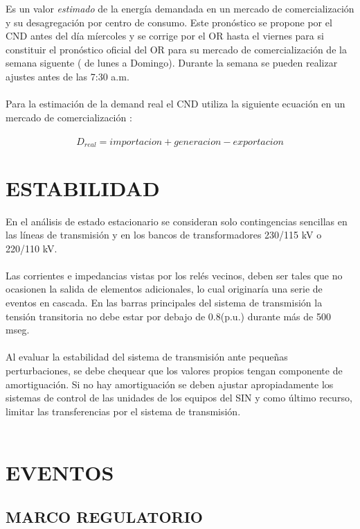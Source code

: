 \documentclass[a5paper]{book}%
\begin{document}
Es un valor \textit{estimado} de la energía demandada en un mercado de
comercialización y su desagregación por centro de consumo. Este
pronóstico se propone por el CND antes del día míercoles y se corrige
por el OR hasta el viernes para si constituir el pronóstico oficial
del OR para su mercado de comercialización de la semana siguente ( de
lunes a Domingo). Durante la semana se pueden realizar ajustes antes
de las 7:30 a.m.\\\\
Para la estimación de la demand real el CND utiliza la siguiente
ecuación en un mercado de comercialización :\\\\
\[D_{real} = importacion + generacion - exportacion \]

\chapter{ESTABILIDAD}
 En el análisis de estado estacionario se consideran solo
  contingencias sencillas en las líneas de transmisión y en los bancos
  de transformadores 230/115 kV o 220/110 kV.\\\\
	
	
 Las corrientes e impedancias vistas por los relés vecinos, deben
  ser tales que no ocasionen la salida de elementos adicionales, lo
  cual originaría una serie de eventos en cascada.  En las barras
  principales del sistema de transmisión la tensión transitoria no
  debe estar por debajo de 0.8(p.u.) durante más de 500 mseg.\\\\
	
 Al evaluar la estabilidad del sistema de transmisión ante
  pequeñas perturbaciones, se debe chequear que los valores propios
  tengan componente de amortiguación. Si no hay amortiguación se deben
  ajustar apropiadamente los sistemas de control de las unidades de
  los equipos del SIN y como último recurso, limitar las
  transferencias por el sistema de transmisión.\\\\

  \chapter{EVENTOS}

  \section{MARCO REGULATORIO}
\end{document}
